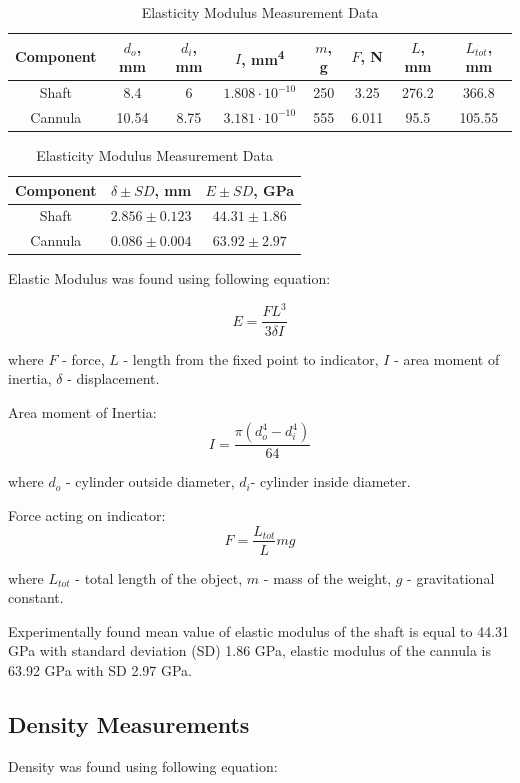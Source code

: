\begin{table}[h]
\caption {Elasticity Modulus Measurement Data} \label{tab:elasMod} 
\begin{tabular}{ | c | c | c | c | c | c | c | c | } 
\hline
Component & $d_o$, mm & $d_i$, mm & $I$, mm\textsuperscript{4} & $m$, g & $F$, N & $L$, mm & $L_{tot}$, mm \\ 
\hline
Shaft & 8.4 & 6 & $1.808 \cdot 10^{-10}$ & 250 & 3.25 & 276.2 & 366.8\\ 
\hline
Cannula & 10.54 & 8.75 & $3.181 \cdot 10^{-10}$ & 555 & 6.011 & 95.5 & 105.55 \\ 
\hline
\end{tabular}

\begin{tabular}{ | c | c | c | } 
\hline
Component & $\delta \pm SD$, mm & $E \pm SD$, GPa \\ 
\hline
Shaft & $2.856 \pm 0.123$ & $44.31 \pm 1.86$ \\ 
\hline
Cannula & $0.086 \pm 0.004$ & $63.92 \pm 2.97$ \\ 
\hline
\end{tabular}
\end{table}

Elastic Modulus was found using following equation:

\begin{equation}
E = \frac{FL^3}{3 \delta I} 
\end{equation}

where $F$ - force, $L$ - length from the fixed point to indicator, $I$ - area moment of inertia, $\delta$ - displacement.

Area moment of Inertia: 
\begin{equation}
I = \frac{\pi (d_o^4 - d_i^4)}{64}
\end{equation}

where $d_o$ - cylinder outside diameter, $d_i$- cylinder inside diameter.

Force acting on indicator:
\begin{equation}
F = \frac{L_{tot}}{L}mg
\end{equation}

where $L_{tot}$ - total length of the object, $m$ - mass of the weight, $g$ - gravitational constant.

Experimentally found mean value of elastic modulus of the shaft is equal to 44.31 GPa with standard deviation (SD) 1.86 GPa, elastic modulus of the cannula is 63.92 GPa with SD 2.97 GPa.

	\subsection{Density Measurements}
	\label{sec:DenMeas}
Density was found using following equation:

